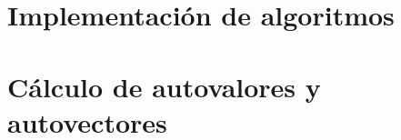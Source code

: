 \documentclass[0_algebra.tex]{subfiles}
\begin{document}
\section{Implementación de algoritmos}
\begin{figure}[h]
	\centering
	
\end{figure}

\section{Cálculo de autovalores y autovectores}
\begin{figure}[h]
	\centering
	
\end{figure}


\begin{figure}[h]
	\centering
	
\end{figure}
\end{document}
